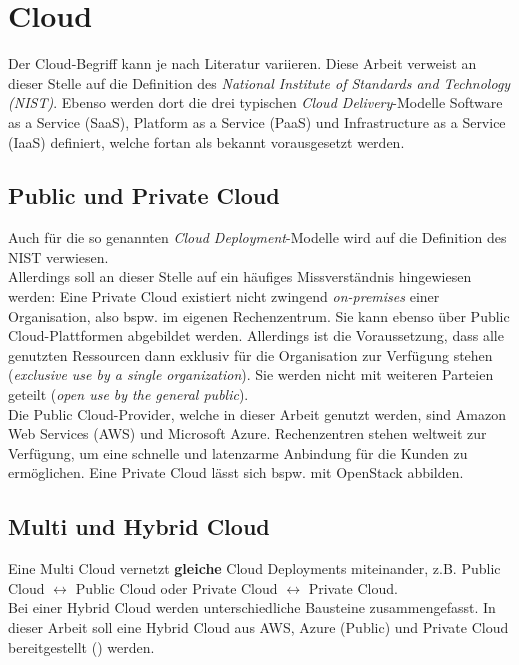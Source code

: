 \section{Cloud}\label{cloud}
Der Cloud-Begriff kann je nach Literatur variieren. Diese Arbeit verweist an dieser Stelle auf die Definition des \textit{National Institute of Standards and Technology (NIST)}. Ebenso werden dort die drei typischen \textit{Cloud Delivery}-Modelle Software as a Service (SaaS), Platform as a Service (PaaS) und Infrastructure as a Service (IaaS) definiert, welche fortan als bekannt vorausgesetzt werden.\cite{mell2011}

\subsection{Public und Private Cloud}
Auch für die so genannten \textit{Cloud \gls{Deployment}}-Modelle wird auf die Definition des NIST verwiesen.\cite{mell2011}\\
Allerdings soll an dieser Stelle auf ein häufiges Missverständnis hingewiesen werden: Eine Private Cloud existiert nicht zwingend \textit{\gls{on-premises}} einer Organisation, also bspw. im eigenen Rechenzentrum. Sie kann ebenso über Public Cloud-Plattformen abgebildet werden. Allerdings ist die Voraussetzung, dass alle genutzten Ressourcen dann exklusiv für die Organisation zur Verfügung stehen (\textit{exclusive use by a single organization}). Sie werden nicht mit weiteren Parteien geteilt (\textit{open use by the general public}).\\
Die Public Cloud-Provider, welche in dieser Arbeit genutzt werden, sind Amazon Web Services (AWS) und Microsoft Azure. Rechenzentren stehen weltweit zur Verfügung, um eine schnelle und latenzarme Anbindung für die Kunden zu ermöglichen. Eine Private Cloud lässt sich bspw. mit OpenStack abbilden\cite{sefraoui2012openstack}.

\subsection{Multi und Hybrid Cloud}
Eine Multi Cloud vernetzt \textbf{gleiche} Cloud \gls{Deployment}s miteinander, z.B. Public Cloud 	$\leftrightarrow$ Public Cloud oder Private Cloud $\leftrightarrow$ Private Cloud.\\
Bei einer Hybrid Cloud werden unterschiedliche Bausteine zusammengefasst. In dieser Arbeit soll eine Hybrid Cloud aus AWS, Azure (Public) und Private Cloud bereitgestellt (\grqq{}) werden.

